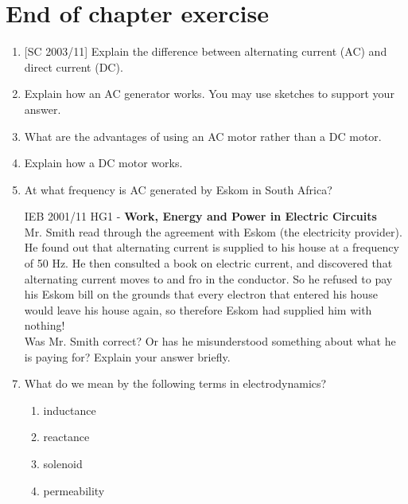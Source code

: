 \section{End of chapter exercise}
\begin{enumerate}
\item{[SC 2003/11] Explain the difference between alternating current (AC) and direct current (DC).}

\item Explain how an AC generator works. You may use sketches to support your answer.

\item What are the advantages of using an AC motor rather than a DC motor.

\item Explain how a DC motor works.
 
\item At what frequency is AC generated by Eskom in South Africa?

\item [IEB 2001/11 HG1] - \textbf{Work, Energy and Power in Electric Circuits}\\
Mr. Smith read through the agreement with Eskom (the electricity provider). He found out that alternating current is supplied to his house at a frequency of 50 Hz. He then consulted a book on electric current, and discovered that alternating current moves to and fro in the conductor. So he refused to pay his Eskom bill on the grounds that every electron that entered his house would leave his house again, so therefore Eskom had supplied him with nothing!\\
 
Was Mr. Smith correct? Or has he misunderstood something about what he is paying for? Explain your answer briefly.
 

\item What do we mean by the following terms in electrodynamics?
\begin{enumerate}
\item inductance
\item reactance
\item solenoid
\item permeability

\end{enumerate}

\end{enumerate}





